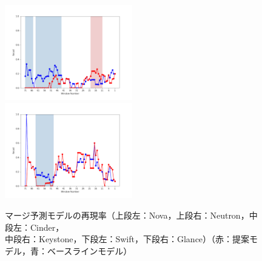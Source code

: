 \documentclass[submit]{ipsj}
\begin{document}
\begin{figure}[t]
\begin{minipage}{\textwidth}
\begin{center}
    \includegraphics[width=0.495\textwidth]{Uenaka_fig/RQ2_result/Swift/Swift_merge_Recall.pdf}
    \includegraphics[width=0.495\textwidth]{Uenaka_fig/RQ2_result/Glance/Glance_merge_Recall.pdf}
    \caption{マージ予測モデルの再現率（上段左：Nova，上段右：Neutron，中段左：Cinder，\\ 中段右：Keystone，下段左：Swift，下段右：Glance）（赤：提案モデル，青：ベースラインモデル）}
    \label{fig:merge_r}
\end{center}
\vspace{0.08\textheight}
\end{minipage}
\end{figure}
\end{document}
